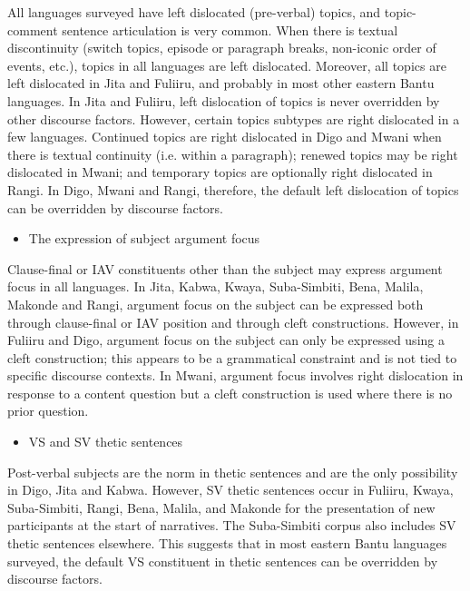 \documentclass[output=paper]{langsci/langscibook}
\begin{document}
All languages surveyed have left dislocated (pre-verbal) topics, and topic-comment sentence articulation is very common. When there is textual discontinuity (switch topics, episode or paragraph breaks, non-iconic order of events, etc.), topics in all languages are left dislocated. Moreover, all topics are left dislocated in Jita and Fuliiru, and probably in most other eastern Bantu languages. In Jita and Fuliiru, left dislocation of topics is never overridden by other discourse factors. However, certain topics subtypes are right dislocated in a few languages. Continued topics are right dislocated in Digo and Mwani when there is textual continuity (i.e. within a paragraph); renewed topics may be right dislocated in Mwani; and temporary topics are optionally right dislocated in Rangi. In Digo, Mwani and Rangi, therefore, the default left dislocation of topics can be overridden by discourse factors.

\begin{itemize}
\item The expression of subject argument focus
\end{itemize}

Clause-final or IAV constituents other than the subject may express argument focus in all languages. In Jita, Kabwa, Kwaya, Suba-Simbiti, Bena, Malila, Makonde and Rangi, argument focus on the subject can be expressed both through clause-final or IAV position and through cleft constructions. However, in Fuliiru and Digo, argument focus on the subject can only be expressed using a cleft construction; this appears to be a grammatical constraint and is not tied to specific discourse contexts. In Mwani, argument focus involves right dislocation in response to a content question but a cleft construction is used where there is no prior question.

\begin{itemize}
\item VS and SV thetic sentences
\end{itemize}

Post-verbal subjects are the norm in thetic sentences and are the only possibility in Digo, Jita and Kabwa. However, SV thetic sentences occur in Fuliiru, Kwaya, Suba-Simbiti, Rangi, Bena, Malila, and Makonde for the presentation of new participants at the start of narratives. The Suba-Simbiti corpus also includes SV thetic sentences elsewhere. This suggests that in most eastern Bantu languages surveyed, the default VS constituent in thetic sentences can be overridden by discourse factors.
\end{document}
